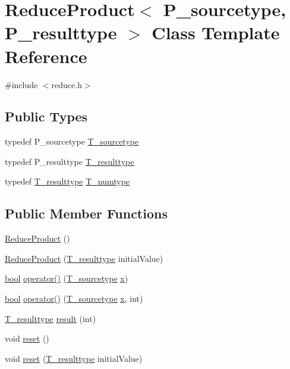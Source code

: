 \hypertarget{classReduceProduct}{}\section{Reduce\+Product$<$ P\+\_\+sourcetype, P\+\_\+resulttype $>$ Class Template Reference}
\label{classReduceProduct}


{\ttfamily \#include $<$reduce.\+h$>$}

\subsection*{Public Types}
\begin{DoxyCompactItemize}
\item 
typedef P\+\_\+sourcetype \hyperlink{classReduceProduct_a1d6481320a3565d8af41236e92cfd22d}{T\+\_\+sourcetype}
\item 
typedef P\+\_\+resulttype \hyperlink{classReduceProduct_a042fd3f78d9968e5534a1783758cb838}{T\+\_\+resulttype}
\item 
typedef \hyperlink{classReduceProduct_a042fd3f78d9968e5534a1783758cb838}{T\+\_\+resulttype} \hyperlink{classReduceProduct_a1f98f468942c947df3e5357c0a09d10e}{T\+\_\+numtype}
\end{DoxyCompactItemize}
\subsection*{Public Member Functions}
\begin{DoxyCompactItemize}
\item 
\hyperlink{classReduceProduct_ad1838adc9eaab4138ce5ca080e0936b3}{Reduce\+Product} ()
\item 
\hyperlink{classReduceProduct_acb8764bd12157dce859deaf0015a69f6}{Reduce\+Product} (\hyperlink{classReduceProduct_a042fd3f78d9968e5534a1783758cb838}{T\+\_\+resulttype} initial\+Value)
\item 
\hyperlink{compiler_8h_abb452686968e48b67397da5f97445f5b}{bool} \hyperlink{classReduceProduct_a5dac06792557d291929998479acd3829}{operator()} (\hyperlink{classReduceProduct_a1d6481320a3565d8af41236e92cfd22d}{T\+\_\+sourcetype} \hyperlink{vecnorm1_8cc_ac73eed9e41ec09d58f112f06c2d6cb63}{x})
\item 
\hyperlink{compiler_8h_abb452686968e48b67397da5f97445f5b}{bool} \hyperlink{classReduceProduct_a68a08e1ee4c71f7f535f5c63ac7127cf}{operator()} (\hyperlink{classReduceProduct_a1d6481320a3565d8af41236e92cfd22d}{T\+\_\+sourcetype} \hyperlink{vecnorm1_8cc_ac73eed9e41ec09d58f112f06c2d6cb63}{x}, int)
\item 
\hyperlink{classReduceProduct_a042fd3f78d9968e5534a1783758cb838}{T\+\_\+resulttype} \hyperlink{classReduceProduct_ab673075d6bee2ff4b49010a65f6ca5f9}{result} (int)
\item 
void \hyperlink{classReduceProduct_a5b934dec7240a3ef7719f7f4c7a80836}{reset} ()
\item 
void \hyperlink{classReduceProduct_ae52d56c0d206484146441119d93140de}{reset} (\hyperlink{classReduceProduct_a042fd3f78d9968e5534a1783758cb838}{T\+\_\+resulttype} initial\+Value)
\end{DoxyCompactItemize}
